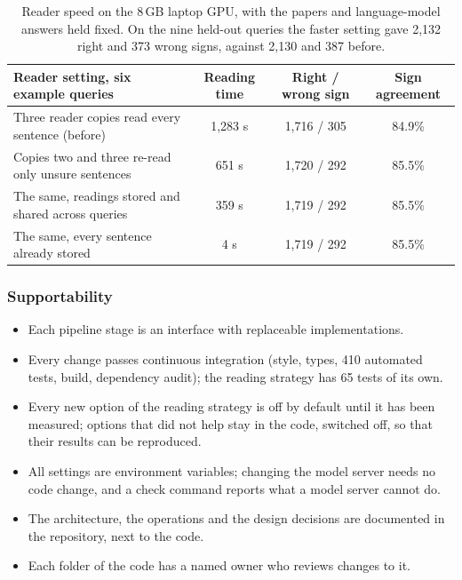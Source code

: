 \documentclass[11pt,a4paper]{article}
\begin{document}
\begin{table}[htbp]
\centering
\small
\begin{tabularx}{\textwidth}{@{}Lccc@{}}
\toprule
\textbf{Reader setting, six example queries} & \textbf{Reading time} & \textbf{Right / wrong sign} & \textbf{Sign agreement}\\
\midrule
Three reader copies read every sentence (before) & 1,283 s & 1,716 / 305 & 84.9\%\\
Copies two and three re-read only unsure sentences & 651 s & 1,720 / 292 & 85.5\%\\
The same, readings stored and shared across queries & 359 s & 1,719 / 292 & 85.5\%\\
The same, every sentence already stored & 4 s & 1,719 / 292 & 85.5\%\\
\bottomrule
\end{tabularx}
\caption{Reader speed on the 8\,GB laptop GPU, with the papers and language-model answers held
fixed. On the nine held-out queries the faster setting gave 2,132 right and 373 wrong signs, against
2,130 and 387 before.}
\label{tab:speed}
\end{table}

\subsubsection{Supportability}
\begin{itemize}
  \item Each pipeline stage is an interface with replaceable implementations.
  \item Every change passes continuous integration (style, types, 410 automated tests, build,
    dependency audit); the reading strategy has 65 tests of its own.
  \item Every new option of the reading strategy is off by default until it has been measured;
    options that did not help stay in the code, switched off, so that their results can be
    reproduced.
  \item All settings are environment variables; changing the model server needs no code change,
    and a check command reports what a model server cannot do.
  \item The architecture, the operations and the design decisions are documented in the
    repository, next to the code.
  \item Each folder of the code has a named owner who reviews changes to it.
\end{itemize}
\end{document}
